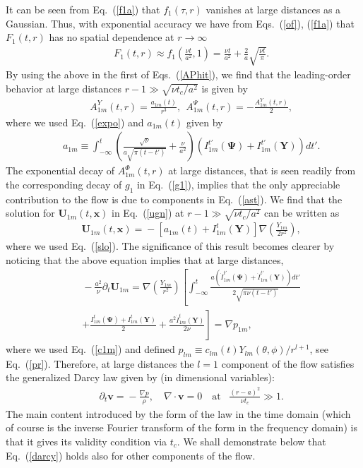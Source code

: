 \documentclass[aps,prx,twocolumn,amsmath,amssymb,amsfonts]{revtex4-2}
\begin{document}
It can be seen from Eq.~(\ref{f1a}) that $f_1(\tau, r)$ vanishes at large distances as a Gaussian. Thus, with exponential accuracy we have from Eqs.~(\ref{of}), (\ref{f1a}) that $F_1(t, r)$ has no spatial dependence at $r\to\infty$
\begin{eqnarray}&&\!\!\!\!\!\!\!
F_1(t, r)\approx f_1\left(\frac{\nu t}{a^2}, 1\right)=\frac{\nu t}{a^2}+\frac{2}{a}\sqrt{\frac{\nu t}{\pi}}. \label{f1}
\end{eqnarray}
By using the above in the first of Eqs.~(\ref{APhit}), we find that the leading-order behavior at large distances $r\!-\!1\gg \sqrt{\nu t_c/a^2}$ is given by
\begin{eqnarray}&&
A_{1m}^{Y}(t, r)\! = \!\frac{a_{1m}(t)}{r^3},\ \ A_{1m}^{\Psi}(t, r)=-\frac{A_{1m}^{Y}(t, r)}{2}, \label{ast}
\end{eqnarray}
where we used Eq.~(\ref{expo}) and $a_{1m}(t)$ given by
\begin{eqnarray}&&\!\!\!\!\!\!\!
a_{1m}\!\equiv\!\!\int_{-\infty}^{t}\!\!\!
\left(\!\frac{\sqrt{\nu}}{a\sqrt{\pi(t\!-\!t')}}\!+\!\frac{\nu}{a^2}\!\right)
 (I_{1m}^{t'}(\bm \Psi) \!+\!I_{1m}^{t'}(\bm Y))dt'. \label{ako}
\end{eqnarray}
The exponential decay of $A_{1m}^{\Phi}(t, r)$ at large distances, that is seen readily from the corresponding decay of $g_1$ in Eq.~(\ref{g1}), implies that the only appreciable contribution to the flow is due to components in Eq.~(\ref{ast}). We find that the solution for $\bm U_{1m}(t, \bm x)$ in Eq.~(\ref{ugn}) at $r\!-\!1\gg \sqrt{\nu t_c/a^2}$ can be written as
\begin{eqnarray}&&\!\!\!\!\!\!
\bm U_{1m}(t, \bm x) \!=\!-\left[a_{1m}(t)+I^{t}_{1m}(\bm Y)\right]\nabla \left(\frac{Y_{1m}}{2r^2}\right),\label{cf}
\end{eqnarray}
where we used Eq.~(\ref{slo}). The significance of this result becomes clearer by noticing that the above equation implies that at large distances,
\begin{eqnarray}&&\!\!\!\!
-\frac{a^2}{\nu}\partial_t\bm U_{1m}\!=\!\nabla \left(\frac{Y_{1m}}{r^2}\right)
\left[\int_{-\infty}^{t}\! \frac{a( \dot{I}_{1m}^{t'}(\bm \Psi) \!+\! \dot{I}_{1m}^{t'}(\bm Y))dt'}{2\sqrt{\pi \nu (t-t')}}
\right.\nonumber\\&&\!\!\!\!\left.
+\frac{I_{1m}^{t}(\bm \Psi) \!+\!I_{1m}^{t}(\bm Y)}{2}
+\frac{a^2\dot{I}_{1m}^{t}(\bm Y)}{2\nu}\right]\!=\!\nabla p_{1m},
\end{eqnarray}
where we used Eq.~(\ref{c1m}) and defined $p_{lm}\equiv c_{lm}(t)Y_{lm}(\theta, \phi)/r^{l+1}$, see Eq.~(\ref{pr}). Therefore, at large distances the $l=1$ component of the flow satisfies the generalized Darcy law given by (in dimensional variables):
\begin{eqnarray}&&\!\!\!\!\!
\partial_t \bm v\!=\!-\frac{\nabla p}{\rho}, \quad \nabla\cdot\bm v=0 \quad \mbox{at}\;\;\; \frac{(r\!-\!a)^2}{\nu t_c}\!\gg\! 1. \label{darcy}
\end{eqnarray}
The main content introduced by the form of the law in the time domain (which of course is the inverse Fourier transform of the form in the frequency domain) is that it gives its validity condition via $t_c$. We shall demonstrate below that Eq.~(\ref{darcy}) holds also for other components of the flow.
\end{document}
